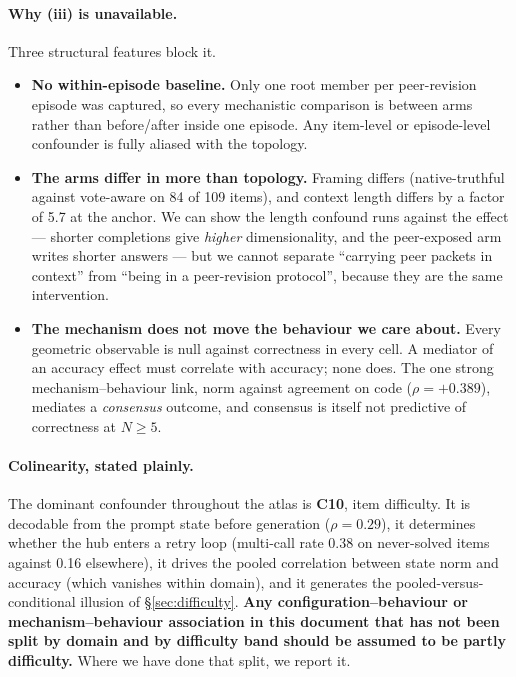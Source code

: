 \documentclass[10pt,a4paper]{article}
\newcommand{\ax}[1]{\textcolor{accent}{\textbf{#1}}}
\begin{document}
\paragraph{Why (iii) is unavailable.} Three structural features block it.
\begin{itemize}
\item \textbf{No within-episode baseline.} Only one root member per peer-revision episode was captured, so every mechanistic comparison is between arms rather than before/after inside one episode. Any item-level or episode-level confounder is fully aliased with the topology.
\item \textbf{The arms differ in more than topology.} Framing differs (native-truthful against vote-aware on 84 of 109 items), and context length differs by a factor of 5.7 at the anchor. We can show the length confound runs against the effect --- shorter completions give \emph{higher} dimensionality, and the peer-exposed arm writes shorter answers --- but we cannot separate ``carrying peer packets in context'' from ``being in a peer-revision protocol'', because they are the same intervention.
\item \textbf{The mechanism does not move the behaviour we care about.} Every geometric observable is null against correctness in every cell. A mediator of an accuracy effect must correlate with accuracy; none does. The one strong mechanism--behaviour link, norm against agreement on code ($\rho=+0.389$), mediates a \emph{consensus} outcome, and consensus is itself not predictive of correctness at $N\ge5$.
\end{itemize}

\paragraph{Colinearity, stated plainly.} The dominant confounder throughout the atlas is \ax{C10}, item difficulty. It is decodable from the prompt state before generation ($\rho=0.29$), it determines whether the hub enters a retry loop (multi-call rate 0.38 on never-solved items against 0.16 elsewhere), it drives the pooled correlation between state norm and accuracy (which vanishes within domain), and it generates the pooled-versus-conditional illusion of \S\ref{sec:difficulty}. \textbf{Any configuration--behaviour or mechanism--behaviour association in this document that has not been split by domain and by difficulty band should be assumed to be partly difficulty.} Where we have done that split, we report it.
\end{document}
